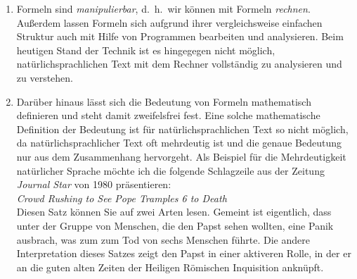 \begin{enumerate}
\item Formeln sind \emph{manipulierbar}, d.~h.~wir k\"{o}nnen mit Formeln \emph{rechnen}.
      Außerdem lassen Formeln sich aufgrund ihrer vergleichsweise einfachen Struktur auch 
      mit Hilfe von Programmen bearbeiten und analysieren.  Beim heutigen Stand der Technik ist
      es hingegegen nicht m\"{o}glich, nat\"{u}rlichsprachlichen Text mit dem Rechner vollst\"{a}ndig
      zu analysieren und zu verstehen.
\item Dar\"{u}ber hinaus l\"{a}sst sich die Bedeutung von Formeln mathematisch definieren und
      steht damit zweifelsfrei fest.  Eine solche mathematische Definition der Bedeutung
      ist f\"{u}r nat\"{u}rlichsprachlichen Text so nicht m\"{o}glich, da
      nat\"{u}rlichsprachlicher Text oft mehrdeutig ist und die genaue Bedeutung nur
      aus dem Zusammenhang hervorgeht.  Als Beispiel f\"{u}r die Mehrdeutigkeit nat\"{u}rlicher
      Sprache m\"{o}chte ich die folgende Schlagzeile aus der Zeitung \textsl{Journal Star}
      von 1980 pr\"{a}sentieren:
      \\[0.2cm]
      \hspace*{1.3cm}
      \textsl{Crowd Rushing to See Pope Tramples 6 to Death}
      \\[0.2cm]
      Diesen Satz k\"{o}nnen Sie auf zwei Arten lesen.  Gemeint ist eigentlich, dass unter der
      Gruppe von Menschen, die den Papst sehen wollten, eine Panik ausbrach, was zum zum
      Tod von sechs Menschen f\"{u}hrte.  Die andere Interpretation dieses Satzes zeigt den
      Papst in einer aktiveren Rolle, in der er an die guten alten Zeiten der Heiligen
      R\"{o}mischen Inquisition ankn\"{u}pft.
\end{enumerate}

